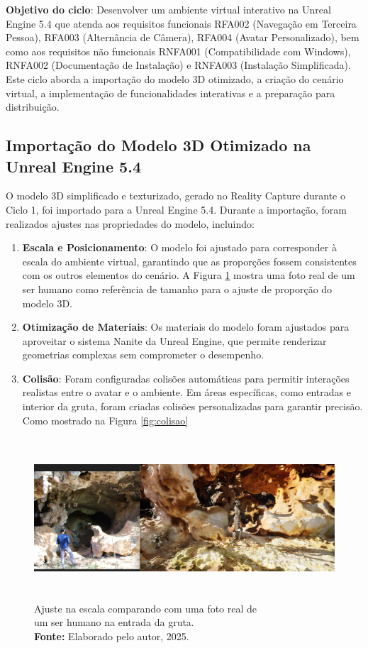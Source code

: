 \textbf{Objetivo do ciclo}: Desenvolver um ambiente virtual interativo na Unreal Engine 5.4 que atenda aos requisitos funcionais RFA002 (Navegação em Terceira Pessoa), RFA003 (Alternância de Câmera), RFA004 (Avatar Personalizado), bem como aos requisitos não funcionais RNFA001 (Compatibilidade com Windows), RNFA002 (Documentação de Instalação) e RNFA003 (Instalação Simplificada). Este ciclo aborda a importação do modelo 3D otimizado, a criação do cenário virtual, a implementação de funcionalidades interativas e a preparação para distribuição.

\subsection{Importação do Modelo 3D Otimizado na Unreal Engine 5.4}
O modelo 3D simplificado e texturizado, gerado no Reality Capture durante o Ciclo 1, foi importado para a Unreal Engine 5.4. Durante a importação, foram realizados ajustes nas propriedades do modelo, incluindo:
\begin{enumerate}
    \item \textbf{Escala e Posicionamento}: O modelo foi ajustado para corresponder à escala do ambiente virtual, garantindo que as proporções fossem consistentes com os outros elementos do cenário. A Figura \ref{fig:escala} mostra uma foto real de um ser humano como referência de tamanho para o ajuste de proporção do modelo 3D.
    \item \textbf{Otimização de Materiais}: Os materiais do modelo foram ajustados para aproveitar o sistema Nanite da Unreal Engine, que permite renderizar geometrias complexas sem comprometer o desempenho.
    \item \textbf{Colisão}: Foram configuradas colisões automáticas para permitir interações realistas entre o avatar e o ambiente. Em áreas específicas, como entradas e interior da gruta, foram criadas colisões personalizadas para garantir precisão. Como mostrado na Figura \ref{fig:colisao}
\end{enumerate}

\begin{figure}[H]
        \centering
        \includegraphics[height=6cm, keepaspectratio]{img/unreal/escala.png}
        \caption{Ajuste na escala comparando com uma foto real de\\ um ser humano na entrada da gruta. \\
            \textbf{Fonte:} Elaborado pelo autor, 2025.}
        \label{fig:escala}
\end{figure}

